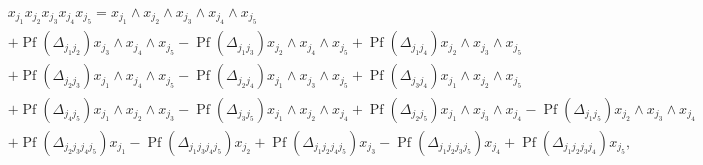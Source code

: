 \documentclass[aps, preprint]{revtex4}
\begin{document}
\begin{align} & x_{j_{1}} x_{j_{2}} x_{j_{3}} x_{j_{4}} x_{j_{5}} =x_{j_{1}} \wedge x_{j_{2}} \wedge x_{j_{3}} \wedge x_{j_{4}} \wedge x_{j_{5}} \nonumber  \\
 &  +\ensuremath{\operatorname*{Pf}} \left ( \Delta _{j_{1} j_{2}}\right ) x_{j_{3}} \wedge x_{j_{4}} \wedge x_{j_{5}} -\ensuremath{\operatorname*{Pf}} \left ( \Delta _{j_{1} j_{3}}\right ) x_{j_{2}} \wedge x_{j_{4}} \wedge x_{j_{5}} +\ensuremath{\operatorname*{Pf}} \left ( \Delta _{j_{1} j_{4}}\right ) x_{j_{2}} \wedge x_{j_{3}} \wedge x_{j_{5}} \nonumber  \\
 &  +\ensuremath{\operatorname*{Pf}} \left ( \Delta _{j_{2} j_{3}}\right ) x_{j_{1}} \wedge x_{j_{4}} \wedge x_{j_{5}} -\ensuremath{\operatorname*{Pf}} \left ( \Delta _{j_{2} j_{4}}\right ) x_{j_{1}} \wedge x_{j_{3}} \wedge x_{j_{5}} +\ensuremath{\operatorname*{Pf}} \left ( \Delta _{j_{3} j_{4}}\right ) x_{j_{1}} \wedge x_{j_{2}} \wedge x_{j_{5}} \nonumber  \\
 &  +\ensuremath{\operatorname*{Pf}} \left ( \Delta _{j_{4} j_{5}}\right ) x_{j_{1}} \wedge x_{j_{2}} \wedge x_{j_{3}} -\ensuremath{\operatorname*{Pf}} \left ( \Delta _{j_{3} j_{5}}\right ) x_{j_{1}} \wedge x_{j_{2}} \wedge x_{j_{4}} +\ensuremath{\operatorname*{Pf}} \left ( \Delta _{j_{2} j_{5}}\right ) x_{j_{1}} \wedge x_{j_{3}} \wedge x_{j_{4}} -\ensuremath{\operatorname*{Pf}} \left ( \Delta _{j_{1} j_{5}}\right ) x_{j_{2}} \wedge x_{j_{3}} \wedge x_{j_{4}} \nonumber  \\
 &  +\ensuremath{\operatorname*{Pf}} \left ( \Delta _{j_{2} j_{3} j_{4} j_{5}}\right ) x_{j_{1}} -\ensuremath{\operatorname*{Pf}} \left ( \Delta _{j_{1} j_{3} j_{4} j_{5}}\right ) x_{j_{2}} +\ensuremath{\operatorname*{Pf}} \left ( \Delta _{j_{1} j_{2} j_{4} j_{5}}\right ) x_{j_{3}} -\ensuremath{\operatorname*{Pf}} \left ( \Delta _{j_{1} j_{2} j_{3} j_{5}}\right ) x_{j_{4}} +\ensuremath{\operatorname*{Pf}} \left ( \Delta _{j_{1} j_{2} j_{3} j_{4}}\right ) x_{j_{5}}\text{,}\end{align}
\end{document}
